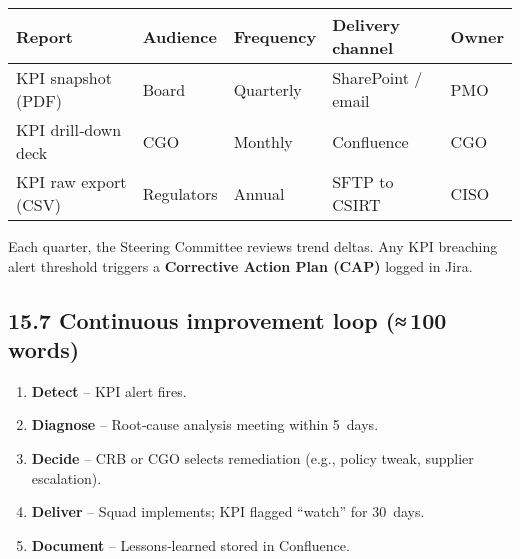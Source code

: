 \documentclass[
  english,
]{article}
\providecommand{\tightlist}{%
  \setlength{\itemsep}{0pt}\setlength{\parskip}{0pt}}
\begin{document}
\begin{longtable}[]{@{}
  >{\raggedright\arraybackslash}p{}
  >{\raggedright\arraybackslash}p{}
  >{\raggedright\arraybackslash}p{}
  >{\raggedright\arraybackslash}p{}
  >{\raggedright\arraybackslash}p{}@{}}
\toprule\noalign{}
\begin{minipage}[b]{\linewidth}\raggedright
Report
\end{minipage} & \begin{minipage}[b]{\linewidth}\raggedright
Audience
\end{minipage} & \begin{minipage}[b]{\linewidth}\raggedright
Frequency
\end{minipage} & \begin{minipage}[b]{\linewidth}\raggedright
Delivery channel
\end{minipage} & \begin{minipage}[b]{\linewidth}\raggedright
Owner
\end{minipage} \\
\midrule\noalign{}
\endhead
\bottomrule\noalign{}
\endlastfoot
KPI snapshot (PDF) & Board & Quarterly & SharePoint / email & PMO \\
KPI drill‑down deck & CGO & Monthly & Confluence & CGO \\
KPI raw export (CSV) & Regulators & Annual & SFTP to CSIRT & CISO \\
\end{longtable}

Each quarter, the Steering Committee reviews trend deltas. Any KPI
breaching alert threshold triggers a \textbf{Corrective Action Plan
(CAP)} logged in Jira.

\subsection{15.7 Continuous improvement loop
(≈\,100\,words)}\label{continuous-improvement-loop-100-words}

\begin{enumerate}
\def\labelenumi{\arabic{enumi}.}
\tightlist
\item
  \textbf{Detect} -- KPI alert fires.
\item
  \textbf{Diagnose} -- Root‑cause analysis meeting within 5~days.
\item
  \textbf{Decide} -- CRB or CGO selects remediation (e.g., policy tweak,
  supplier escalation).
\item
  \textbf{Deliver} -- Squad implements; KPI flagged ``watch'' for
  30~days.
\item
  \textbf{Document} -- Lessons‑learned stored in Confluence.
\end{enumerate}
\end{document}
